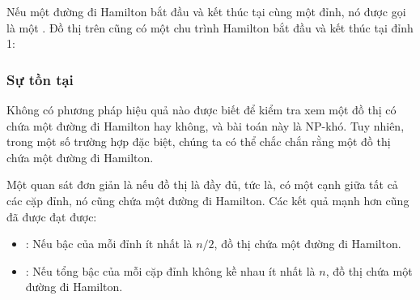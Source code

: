 Nếu một đường đi Hamilton bắt đầu và kết thúc tại cùng một đỉnh,
nó được gọi là một .
Đồ thị trên cũng có một chu trình Hamilton
bắt đầu và kết thúc tại đỉnh 1:
\begin{center}
\end{center}

\subsubsection{Sự tồn tại}

Không có phương pháp hiệu quả nào được biết để kiểm tra xem một đồ thị
có chứa một đường đi Hamilton hay không, và bài toán này là NP-khó.
Tuy nhiên, trong một số trường hợp đặc biệt, chúng ta có thể chắc chắn
rằng một đồ thị chứa một đường đi Hamilton.

Một quan sát đơn giản là nếu đồ thị là đầy đủ,
tức là, có một cạnh giữa tất cả các cặp đỉnh,
nó cũng chứa một đường đi Hamilton.
Các kết quả mạnh hơn cũng đã được đạt được:

\begin{itemize}
\item
{}
: %
Nếu bậc của mỗi đỉnh ít nhất là $n/2$,
đồ thị chứa một đường đi Hamilton.
\item
{}
: %
Nếu tổng bậc của mỗi cặp đỉnh không kề nhau
ít nhất là $n$,
đồ thị chứa một đường đi Hamilton.
\end{itemize}

